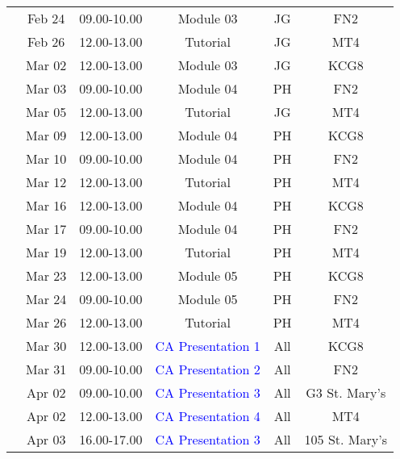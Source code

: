 \documentclass[11pt,oneside,a4paper]{article}
\begin{document}
\begin{center}
\begin{tabular}{||c||c|c|c|c|c||}
                                      & Feb 24   & 09.00-10.00 & Module 03 & JG  & FN2  \\
                                      & Feb 26   & 12.00-13.00 & Tutorial  & JG  & MT4  \\
\hline
\multirow{3}{*}{\color{red}{Week 34}} & Mar 02   & 12.00-13.00 & Module 03 & JG  & KCG8 \\
                                      & Mar 03   & 09.00-10.00 & Module 04 & PH  & FN2  \\
                                      & Mar 05   & 12.00-13.00 & Tutorial  & JG  & MT4  \\
\hline
\multirow{3}{*}{\color{red}{Week 35}} & Mar 09   & 12.00-13.00 & Module 04 & PH  & KCG8 \\
                                      & Mar 10   & 09.00-10.00 & Module 04 & PH  & FN2  \\
                                      & Mar 12   & 12.00-13.00 & Tutorial  & PH  & MT4  \\
\hline
\multirow{2}{*}{\color{red}{Week 36}} & Mar 16   & 12.00-13.00 & Module 04 & PH  & KCG8 \\  
                                      & Mar 17   & 09.00-10.00 & Module 04 & PH  & FN2  \\
                                      & Mar 19   & 12.00-13.00 & Tutorial  & PH  & MT4   \\
\hline
\multirow{2}{*}{\color{red}{Week 37}} & Mar 23   & 12.00-13.00 & Module 05 & PH  & KCG8 \\
                                      & Mar 24   & 09.00-10.00 & Module 05 & PH  & FN2  \\
                                      & Mar 26   & 12.00-13.00 & Tutorial  & PH  & MT4  \\
\hline
\multirow{4}{*}{\color{red}{Week 38}} & Mar 30   & 12.00-13.00 & \textcolor{blue}{CA Presentation 1}  & All & KCG8 \\
                                      & Mar 31   & 09.00-10.00 & \textcolor{blue}{CA Presentation 2}  & All & FN2 \\
                                      & Apr 02   & 09.00-10.00 & \textcolor{blue}{CA Presentation 3}  & All & G3 St. Mary's \\
                                      & Apr 02   & 12.00-13.00 & \textcolor{blue}{CA Presentation 4}  & All & MT4 \\
                                      & Apr 03   & 16.00-17.00 & \textcolor{blue}{CA Presentation 3}  & All & 105 St. Mary's \\
\hline

\hline\hline

\end{tabular}
\end{center}
\end{document}
